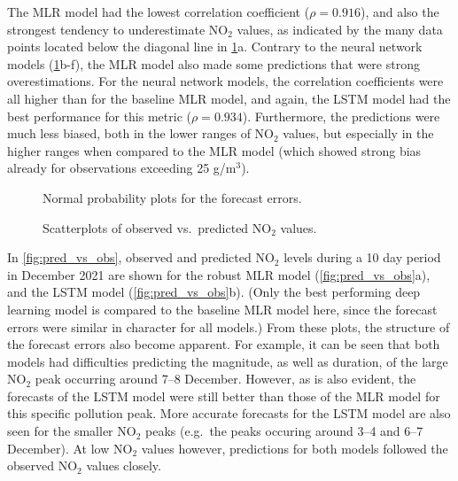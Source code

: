The MLR model had the lowest correlation coefficient ($\rho = 0.916$), and also the strongest tendency to underestimate NO$_2$ values, as indicated by the many data points located below the diagonal line in \cref{fig:correlations}a. Contrary to the neural network models (\cref{fig:correlations}b-f), the MLR model also made some predictions that were strong overestimations. For the neural network models, the correlation coefficients were all higher than for the baseline MLR model, and again, the LSTM model had the best performance for this metric ($\rho=0.934$). Furthermore, the predictions were much less biased, both in the lower ranges of NO$_2$ values, but especially in the higher ranges when compared to the MLR model (which showed strong bias already for observations exceeding 25 \textmugreek g/m$^3$). 
\begin{figure}[h]
\centering
{}
\caption{Normal probability plots for the forecast errors.}
\label{fig:qq-plot-errors}
\vspace*{\floatsep}%
\caption{Scatterplots of observed vs.\ predicted NO$_2$ values.}
\label{fig:correlations}
\end{figure}
\clearpage

\noindent
In \cref{fig:pred_vs_obs}, observed and predicted NO$_2$ levels during a 10 day period in December 2021 are shown for the robust MLR model (\cref{fig:pred_vs_obs}a), and the LSTM model (\cref{fig:pred_vs_obs}b). (Only the best performing deep learning model is compared to the baseline MLR model here, since the forecast errors were similar in character for all models.) From these plots, the structure of the forecast errors also become apparent. For example, it can be seen that both models had difficulties predicting the magnitude, as well as duration, of the large NO$_2$ peak occurring around 7--8 December. However, as is also evident, the forecasts of the LSTM model were still better than those of the MLR model for this specific pollution peak. More accurate forecasts for the LSTM model are also seen for the smaller NO$_2$ peaks (e.g.\ the peaks occuring around 3--4 and 6--7 December). At low NO$_2$ values however, predictions for both models followed the observed NO$_2$ values closely.

